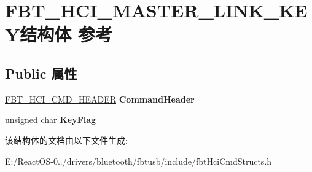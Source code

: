 \hypertarget{struct_f_b_t___h_c_i___m_a_s_t_e_r___l_i_n_k___k_e_y}{}\section{F\+B\+T\+\_\+\+H\+C\+I\+\_\+\+M\+A\+S\+T\+E\+R\+\_\+\+L\+I\+N\+K\+\_\+\+K\+E\+Y结构体 参考}
\label{struct_f_b_t___h_c_i___m_a_s_t_e_r___l_i_n_k___k_e_y}
\subsection*{Public 属性}
\begin{DoxyCompactItemize}
\item 
\mbox{\label{struct_f_b_t___h_c_i___m_a_s_t_e_r___l_i_n_k___k_e_y_a6d904ed531da132585f39352e80edeb7}} 
\hyperlink{struct_f_b_t___h_c_i___c_m_d___h_e_a_d_e_r}{F\+B\+T\+\_\+\+H\+C\+I\+\_\+\+C\+M\+D\+\_\+\+H\+E\+A\+D\+ER} {\bfseries Command\+Header}
\item 
\mbox{\label{struct_f_b_t___h_c_i___m_a_s_t_e_r___l_i_n_k___k_e_y_a8c77c46b9dce7781a4ba1cc3ec5892ed}} 
unsigned char {\bfseries Key\+Flag}
\end{DoxyCompactItemize}


该结构体的文档由以下文件生成\+:\begin{DoxyCompactItemize}
\item 
E\+:/\+React\+O\+S-\/0../drivers/bluetooth/fbtusb/include/fbt\+Hci\+Cmd\+Structs.\+h\end{DoxyCompactItemize}
